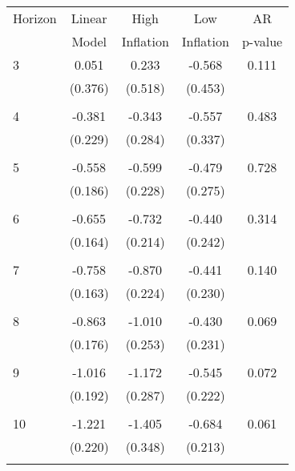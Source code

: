\begin{tabular}{l*{1}{cccc}}
\hline\hline
 Horizon  & Linear & High                 & Low           & AR            \\
                  & Model         & Inflation & Inflation & p-value       \\
\hline
   3       & 0.051 & 0.233 & -0.568 & 0.111 \\
          & (0.376) & (0.518) & (0.453) & \\
 & & & &\\
   4       & -0.381 & -0.343 & -0.557 & 0.483 \\
          & (0.229) & (0.284) & (0.337) & \\
 & & & &\\
   5       & -0.558 & -0.599 & -0.479 & 0.728 \\
          & (0.186) & (0.228) & (0.275) & \\
 & & & &\\
   6       & -0.655 & -0.732 & -0.440 & 0.314 \\
          & (0.164) & (0.214) & (0.242) & \\
 & & & &\\
   7       & -0.758 & -0.870 & -0.441 & 0.140 \\
          & (0.163) & (0.224) & (0.230) & \\
 & & & &\\
   8       & -0.863 & -1.010 & -0.430 & 0.069 \\
          & (0.176) & (0.253) & (0.231) & \\
 & & & &\\
   9       & -1.016 & -1.172 & -0.545 & 0.072 \\
          & (0.192) & (0.287) & (0.222) & \\
 & & & &\\
  10       & -1.221 & -1.405 & -0.684 & 0.061 \\
          & (0.220) & (0.348) & (0.213) & \\
 & & & &\\
\hline\hline
\end{tabular}
